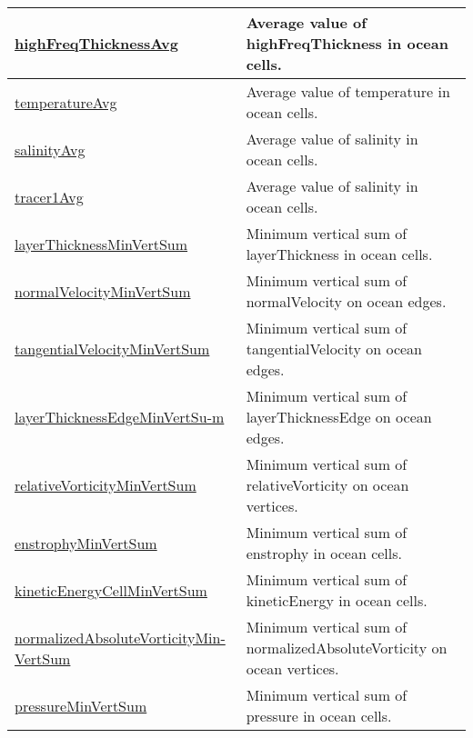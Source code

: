 {\begin{center}
\begin{longtable}{| p{2.0in} | p{4.0in} |}
	\hline
	\hyperref[subsec:var_sec_amGlobalStats_highFreqThicknessAvg]{highFreqThicknessAvg} & Average value of highFreqThickness in ocean cells. \\
	\hline
	\hyperref[subsec:var_sec_amGlobalStats_temperatureAvg]{temperatureAvg} & Average value of temperature in ocean cells. \\
	\hline
	\hyperref[subsec:var_sec_amGlobalStats_salinityAvg]{salinityAvg} & Average value of salinity in ocean cells. \\
	\hline
	\hyperref[subsec:var_sec_amGlobalStats_tracer1Avg]{tracer1Avg} & Average value of salinity in ocean cells. \\
	\hline
	\hyperref[subsec:var_sec_amGlobalStats_layerThicknessMinVertSum]{layerThicknessMinVertSum} & Minimum vertical sum of layerThickness in ocean cells. \\
	\hline
	\hyperref[subsec:var_sec_amGlobalStats_normalVelocityMinVertSum]{normalVelocityMinVertSum} & Minimum vertical sum of normalVelocity on ocean edges. \\
	\hline
	\hyperref[subsec:var_sec_amGlobalStats_tangentialVelocityMinVertSum]{tangentialVelocityMinVertSum} & Minimum vertical sum of tangentialVelocity on ocean edges. \\
	\hline
	\hyperref[subsec:var_sec_amGlobalStats_layerThicknessEdgeMinVertSum]{layerThicknessEdgeMinVertSu-}\hyperref[subsec:var_sec_amGlobalStats_layerThicknessEdgeMinVertSum]{m}  & Minimum vertical sum of layerThicknessEdge on ocean edges. \\
	\hline
	\hyperref[subsec:var_sec_amGlobalStats_relativeVorticityMinVertSum]{relativeVorticityMinVertSum} & Minimum vertical sum of relativeVorticity on ocean vertices. \\
	\hline
	\hyperref[subsec:var_sec_amGlobalStats_enstrophyMinVertSum]{enstrophyMinVertSum} & Minimum vertical sum of enstrophy in ocean cells. \\
	\hline
	\hyperref[subsec:var_sec_amGlobalStats_kineticEnergyCellMinVertSum]{kineticEnergyCellMinVertSum} & Minimum vertical sum of kineticEnergy in ocean cells. \\
	\hline
	\hyperref[subsec:var_sec_amGlobalStats_normalizedAbsoluteVorticityMinVertSum]{normalizedAbsoluteVorticityMin-}\hyperref[subsec:var_sec_amGlobalStats_normalizedAbsoluteVorticityMinVertSum]{VertSum}  & Minimum vertical sum of normalizedAbsoluteVorticity on ocean vertices. \\
	\hline
	\hyperref[subsec:var_sec_amGlobalStats_pressureMinVertSum]{pressureMinVertSum} & Minimum vertical sum of pressure in ocean cells. \\

\end{longtable}
\end{center}}
